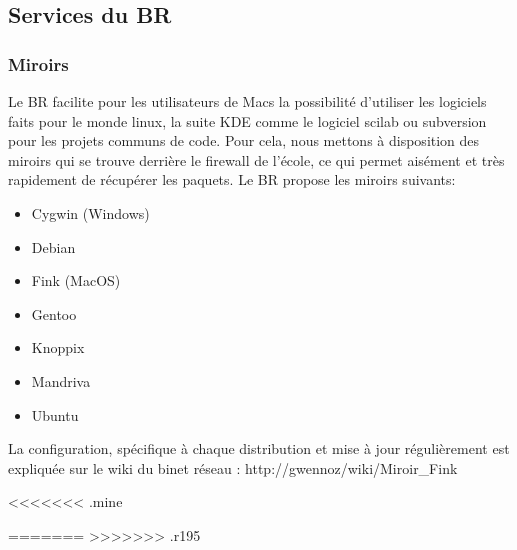 \subsection{Services du BR}
\subsubsection{Miroirs}
Le BR facilite pour les utilisateurs de Macs la possibilit\'e d'utiliser les logiciels faits pour le monde linux, la suite KDE comme le logiciel scilab ou subversion pour les projets communs de code. Pour cela, nous mettons \`a disposition des miroirs qui se trouve derri\`ere le firewall de l'\'ecole, ce qui permet ais\'ement et tr\`es rapidement de r\'ecup\'erer les paquets. Le BR propose les miroirs suivants:
\begin{itemize}
\item Cygwin (Windows)
\item Debian
\item Fink (MacOS)
\item Gentoo
\item Knoppix
\item Mandriva
\item Ubuntu
\end{itemize}

La configuration, sp\'ecifique \`a chaque distribution et mise \`a jour r\'eguli\`erement est expliqu\'ee sur le wiki du binet r\'eseau : 
http://gwennoz/wiki/Miroir\_Fink

<<<<<<< .mine

=======
>>>>>>> .r195
